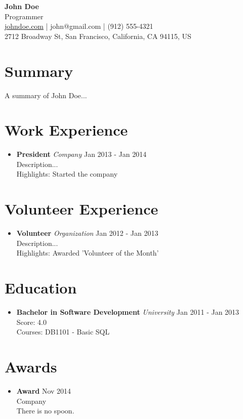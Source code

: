 \documentclass{article}
\newcommand{\entry}[2]{
    \textbf{#1} \hfill \textit{#2}
}
\begin{document}
\begin{flushleft}
    \textbf{\LARGE John Doe} \\
    Programmer \\
    \href{https://johndoe.com}{johndoe.com} | john@gmail.com | (912) 555-4321 \\
    2712 Broadway St, San Francisco, California, CA 94115, US
\end{flushleft}

\section*{Summary}
A summary of John Doe...

\section*{Work Experience}
\begin{itemize}[leftmargin=*]
    \item \entry{President}{Company} \hfill Jan 2013 - Jan 2014 \\
    Description... \\
    Highlights: Started the company
\end{itemize}

\section*{Volunteer Experience}
\begin{itemize}[leftmargin=*]
    \item \entry{Volunteer}{Organization} \hfill Jan 2012 - Jan 2013 \\
    Description... \\
    Highlights: Awarded 'Volunteer of the Month'
\end{itemize}

\section*{Education}
\begin{itemize}[leftmargin=*]
    \item \entry{Bachelor in Software Development}{University} \hfill Jan 2011 - Jan 2013 \\
    Score: 4.0 \\
    Courses: DB1101 - Basic SQL
\end{itemize}

\section*{Awards}
\begin{itemize}[leftmargin=*]
    \item \textbf{Award} \hfill Nov 2014 \\
    Company \\
    There is no spoon.
\end{itemize}
\end{document}

